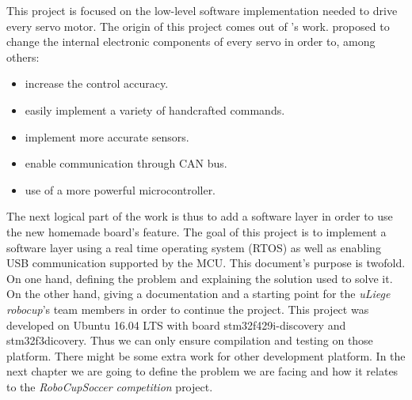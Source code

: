 \documentclass[12pt,a4paper]{report}
\begin{document}
This project is focused on the low-level software implementation needed to drive every servo motor. 
The origin of this project comes out of \cite{masterGL}'s work. \cite{masterGL} proposed to change the internal electronic components of every servo in order to, among others:
\begin{itemize}
\item increase the control accuracy.
\item easily implement a variety of handcrafted commands.
\item implement more accurate sensors.
\item enable communication through CAN bus.
\item use of a more powerful microcontroller.
\end{itemize}
The next logical part of the work is thus to add a software layer in order to use the new homemade board's feature.\newline
The goal of this project is to implement a software layer using a real time operating system (RTOS) as well as enabling USB communication supported by the MCU.\newline
This document's purpose is twofold. On one hand, defining the problem and explaining the solution used to solve it. On the other hand, giving a documentation and a starting point for the \emph{uLiege robocup}'s team members in order to continue the project.\newline
This project was developed on Ubuntu 16.04 LTS with board stm32f429i-discovery and\\ stm32f3dicovery. Thus we can only ensure compilation and testing on those platform. There might be some extra work for other development platform.\newline
In the next chapter we are going to define the problem we are facing and how it relates to the \emph{RoboCupSoccer competition} project.\newpage
\end{document}
